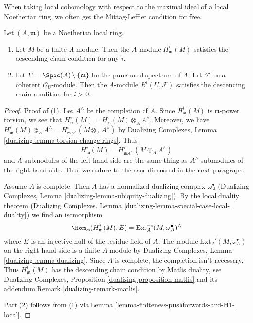 \noindent
When taking local cohomology with respect to the maximal ideal
of a local Noetherian ring, we often get the Mittag-Leffler condition
for free.

\begin{lemma}
\label{lemma-descending-chain}
Let $(A, \mathfrak m)$ be a Noetherian local ring.
\begin{enumerate}
\item Let $M$ be a finite $A$-module. Then the $A$-module
$H^i_\mathfrak m(M)$ satisfies the descending chain condition
for any $i$.
\item Let $U = \Spec(A) \setminus \{\mathfrak m\}$ be the
punctured spectrum of $A$.
Let $\mathcal{F}$ be a coherent $\mathcal{O}_U$-module.
Then the $A$-module $H^i(U, \mathcal{F})$
satisfies the descending chain condition for $i > 0$.
\end{enumerate}
\end{lemma}

\begin{proof}
Proof of (1). Let $A^\wedge$ be the completion of $A$. Since
$H^i_\mathfrak m(M)$ is $\mathfrak m$-power torsion, we see that
$H^i_\mathfrak m(M) = H^i_\mathfrak m(M) \otimes_A A^\wedge$. Moreover,
we have $H^i_\mathfrak m(M) \otimes_A A^\wedge =
H^i_{\mathfrak mA^\wedge}(M \otimes_A A^\wedge)$ by
Dualizing Complexes, Lemma \ref{dualizing-lemma-torsion-change-rings}.
Thus
$$
H^i_\mathfrak m(M) = H^i_{\mathfrak mA^\wedge}(M \otimes_A A^\wedge)
$$
and $A$-submodules of the left hand side are the same thing as
$A^\wedge$-submodules of the right hand side. Thus we reduce
to the case discussed in the next paragraph.

\medskip\noindent
Assume $A$ is complete. Then $A$ has a normalized dualizing complex
$\omega_A^\bullet$ (Dualizing Complexes, Lemma
\ref{dualizing-lemma-ubiquity-dualizing}).
By the local duality theorem (Dualizing Complexes, Lemma
\ref{dualizing-lemma-special-case-local-duality}) we find an isomorphism
$$
\Hom_A(H^i_\mathfrak m(M), E) =
\text{Ext}^{-i}_A(M, \omega_A^\bullet)^\wedge
$$
where $E$ is an injective hull of the residue field of $A$. The module
$\text{Ext}^{-i}_A(M, \omega_A^\bullet)$
on the right hand side is a finite $A$-module by
Dualizing Complexes, Lemma \ref{dualizing-lemma-dualizing}.
Since $A$ is complete, the completion isn't necessary.
Thus $H^i_\mathfrak m(M)$ has the descending chain condition
by Matlis duality, see 
Dualizing Complexes, Proposition \ref{dualizing-proposition-matlis}
and its addendum Remark \ref{dualizing-remark-matlis}.

\medskip\noindent
Part (2) follows from (1) via
Lemma \ref{lemma-finiteness-pushforwards-and-H1-local}.
\end{proof}

